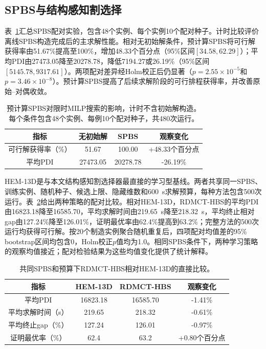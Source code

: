 \documentclass[journal]{IEEEtran}
\newcommand{\method}{RDMCT-HBS}
\begin{document}
\subsection{SPBS与结构感知割选择}

表~\ref{tab:spbs-zh-new}汇总SPBS配对实验，包含48个实例、每个实例10个配对种子。计时比较评价离线SPBS构造完成后的主求解性能。相对无初始解条件，预计算SPBS将可行解获得率由51.67\%提高至100\%，增加48.33个百分点（95\%区间$[34.58,62.29]$）；平均PDI由27473.05降至20278.78，降低7194.27或26.19\%（95\%区间$[5145.78,9317.61]$）。两项配对差异经Holm校正后仍显著（$p=2.55\times10^{-5}$和$p=3.46\times10^{-8}$）。预计算SPBS提高了后续求解阶段的可行排程获得率，并改善原始--对偶收敛。

\begin{table}[!htbp]
\centering
\footnotesize
\setlength{\tabcolsep}{3pt}
\caption{预计算SPBS对限时MILP搜索的影响，计时不含初始解构造。每个条件包含48个实例、每例10个配对种子，共480次运行。}
\label{tab:spbs-zh-new}
\begin{tabular}{cccc}
\toprule
指标 & 无初始解 & SPBS & 观察变化\\
\midrule
可行解获得率（\%） & 51.67 & 100.00 & +48.33个百分点\\
平均PDI & 27473.05 & 20278.78 & -26.19\%\\
\bottomrule
\end{tabular}
\end{table}

HEM-13D是与本文结构感知割选择器最直接的学习型基线。两者共享同一SPBS、训练实例、随机种子、候选上限、隐藏维数和600~s求解预算，每种方法包含500次运行。表~\ref{tab:hem-direct-zh}给出两种策略的配对比较。相对HEM-13D，\method{}的平均PDI由16823.18降至16585.70，平均求解时间由219.65~s降至218.32~s，平均终止相对gap由127.24\%降至126.01\%，证明最优率由62.4\%提高到63.2\%；完整方法的500次运行均获得可行解。按20个制造实例聚合随机重复后，四项配对均值差的95\% bootstrap区间均包含0，Holm校正$p$值均为1.0。相同SPBS条件下，两种学习策略的观察均值接近；配对检验结果为这些均值变化提供了统计解释。

\begin{table}[!htbp]
\centering
\footnotesize
\caption{共同SPBS和预算下\method{}相对HEM-13D的直接比较。}
\label{tab:hem-direct-zh}
\begin{tabular}{cccc}
\toprule
指标 & HEM-13D & \method{} & 观察变化\\
\midrule
平均PDI & 16823.18 & 16585.70 & -1.41\%\\
平均求解时间（s） & 219.65 & 218.32 & -0.61\%\\
平均终止gap（\%） & 127.24 & 126.01 & -0.97\%\\
证明最优率（\%） & 62.4 & 63.2 & +0.80个百分点\\
\bottomrule
\end{tabular}
\end{table}
\end{document}
